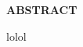 \pagestyle{empty}
\begin{center}
\textup{\Large{\textbf{ABSTRACT}}}
\end{center}

\justify
\indent
lolol
\pagebreak
